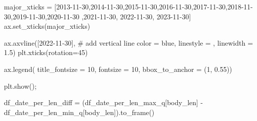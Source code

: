 \documentclass[
  letterpaper,
  DIV=11,
  numbers=noendperiod]{scrartcl}
\newenvironment{Shaded}{\begin{snugshade}}{\end{snugshade}}
\newcommand{\CommentTok}[1]{\textcolor[rgb]{0.37,0.37,0.37}{#1}}
\newcommand{\DecValTok}[1]{\textcolor[rgb]{0.68,0.00,0.00}{#1}}
\newcommand{\FloatTok}[1]{\textcolor[rgb]{0.68,0.00,0.00}{#1}}
\newcommand{\NormalTok}[1]{\textcolor[rgb]{0.00,0.23,0.31}{#1}}
\newcommand{\OperatorTok}[1]{\textcolor[rgb]{0.37,0.37,0.37}{#1}}
\newcommand{\StringTok}[1]{\textcolor[rgb]{0.13,0.47,0.30}{#1}}
\begin{document}
\begin{Shaded}
\begin{Highlighting}[]
\NormalTok{major\_xticks }\OperatorTok{=}\NormalTok{ [}\StringTok{\textquotesingle{}2013{-}11{-}30\textquotesingle{}}\NormalTok{,}\StringTok{\textquotesingle{}2014{-}11{-}30\textquotesingle{}}\NormalTok{,}\StringTok{\textquotesingle{}2015{-}11{-}30\textquotesingle{}}\NormalTok{,}\StringTok{\textquotesingle{}2016{-}11{-}30\textquotesingle{}}\NormalTok{,}\StringTok{\textquotesingle{}2017{-}11{-}30\textquotesingle{}}\NormalTok{,}\StringTok{\textquotesingle{}2018{-}11{-}30\textquotesingle{}}\NormalTok{,}\StringTok{\textquotesingle{}2019{-}11{-}30\textquotesingle{}}\NormalTok{,}\StringTok{\textquotesingle{}2020{-}11{-}30\textquotesingle{}}
\NormalTok{                ,}\StringTok{\textquotesingle{}2021{-}11{-}30\textquotesingle{}}\NormalTok{, }\StringTok{\textquotesingle{}2022{-}11{-}30\textquotesingle{}}\NormalTok{, }\StringTok{\textquotesingle{}2023{-}11{-}30\textquotesingle{}}\NormalTok{]}
\NormalTok{ax.set\_xticks(major\_xticks)}

\NormalTok{ax.axvline([}\StringTok{\textquotesingle{}2022{-}11{-}30\textquotesingle{}}\NormalTok{], }\CommentTok{\# add vertical line}
\NormalTok{           color }\OperatorTok{=} \StringTok{\textquotesingle{}blue\textquotesingle{}}\NormalTok{,}
\NormalTok{           linestyle }\OperatorTok{=} \StringTok{\textquotesingle{}{-}{-}\textquotesingle{}}\NormalTok{,}
\NormalTok{           linewidth }\OperatorTok{=} \FloatTok{1.5}\NormalTok{)}
\NormalTok{plt.xticks(rotation}\OperatorTok{=}\DecValTok{45}\NormalTok{)}



\NormalTok{ax.legend( title\_fontsize }\OperatorTok{=} \DecValTok{10}\NormalTok{, fontsize }\OperatorTok{=} \DecValTok{10}\NormalTok{,}
\NormalTok{          bbox\_to\_anchor }\OperatorTok{=}\NormalTok{ (}\DecValTok{1}\NormalTok{, }\FloatTok{0.55}\NormalTok{))}

\NormalTok{plt.show()}\OperatorTok{;}
\end{Highlighting}
\end{Shaded}

\begin{Shaded}
\begin{Highlighting}[]
\NormalTok{df\_date\_per\_len\_diff }\OperatorTok{=}\NormalTok{ (df\_date\_per\_len\_max\_q[}\StringTok{\textquotesingle{}body\_len\textquotesingle{}}\NormalTok{] }\OperatorTok{{-}}\NormalTok{ df\_date\_per\_len\_min\_q[}\StringTok{\textquotesingle{}body\_len\textquotesingle{}}\NormalTok{]).to\_frame()}
\end{Highlighting}
\end{Shaded}
\end{document}
